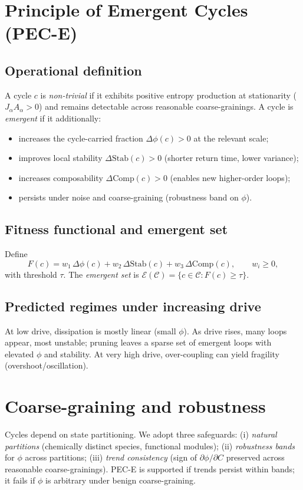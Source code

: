 \documentclass[11pt,a4paper]{article}
\newcommand{\phifrac}{\phi}
\newcommand{\comp}{\mathrm{Comp}}
\newcommand{\stab}{\mathrm{Stab}}
\newcommand{\Eset}{\mathcal{E}}
\newcommand{\Cset}{\mathcal{C}}
\begin{document}
\section{Principle of Emergent Cycles (PEC-E)}
\subsection{Operational definition}
A cycle $c$ is \emph{non-trivial} if it exhibits positive entropy production at stationarity ($J_{\alpha}A_{\alpha}>0$) and remains detectable across reasonable coarse-grainings. A cycle is \emph{emergent} if it additionally:
\begin{itemize}
  \item increases the cycle-carried fraction $\Delta\phifrac(c) > 0$ at the relevant scale;
  \item improves local stability $\Delta\stab(c) > 0$ (shorter return time, lower variance);
  \item increases composability $\Delta\comp(c) > 0$ (enables new higher-order loops);
  \item persists under noise and coarse-graining (robustness band on $\phifrac$).
\end{itemize}

\subsection{Fitness functional and emergent set}
Define
\begin{equation}
F(c) = w_1\,\Delta\phifrac(c) + w_2\,\Delta\stab(c) + w_3\,\Delta\comp(c),\qquad w_i\ge 0,
\end{equation}
with threshold $\tau$. The \emph{emergent set} is $\Eset(\Cset)=\{c\in\Cset: F(c)\ge \tau\}$.

\subsection{Predicted regimes under increasing drive}
At low drive, dissipation is mostly linear (small $\phifrac$). As drive rises, many loops appear, most unstable; pruning leaves a sparse set of emergent loops with elevated $\phifrac$ and stability. At very high drive, over-coupling can yield fragility (overshoot/oscillation).

\section{Coarse-graining and robustness}
Cycles depend on state partitioning. We adopt three safeguards: (i) \emph{natural partitions} (chemically distinct species, functional modules); (ii) \emph{robustness bands} for $\phifrac$ across partitions; (iii) \emph{trend consistency} (sign of $\partial\phifrac/\partial C$ preserved across reasonable coarse-grainings). PEC-E is supported if trends persist within bands; it fails if $\phifrac$ is arbitrary under benign coarse-graining.
\end{document}

